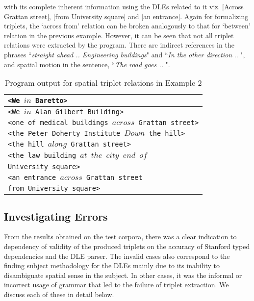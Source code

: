 \documentclass{acm_proc_article-sp}
\begin{document}
with its complete inherent information using the DLEs related to it viz. $[$Across Grattan street$]$, $[$from University square$]$ and $[$an entrance$]$. Again for formalizing triplets, the `across from' relation can be broken analogously to that for `between' relation in the previous example. However, it can be seen that not all triplet relations were extracted by the program. There are indirect references in the phrases ``\textit{straight ahead .. Engineering buildings}" and ``\textit{In the other direction} .. ", and spatial motion in the sentence, ``\textit{The road goes .. }".
\begin{table}
\begin{tabular}{|l|}
\hline
\texttt{<We $in$ Baretto>}\\ \hline
\texttt{<We $in$  Alan Gilbert Building>}\\ \hline
\texttt{<one of medical buildings $across$ Grattan street>}\\ \hline
\texttt{<the Peter Doherty Institute $Down$ the hill>}\\ \hline
\texttt{<the hill $along$ Grattan street>}\\ \hline
\texttt{<the law building $at$  $the$ $city$ $end$ $of$ }\\
\texttt{University square>}\\ \hline
\texttt{<an entrance $across$  Grattan street} \\
\texttt{from University square>}\\ \hline
\end{tabular}
\caption{Program output for spatial triplet relations in Example 2}
\label{table:ex2}
\end{table}
\subsection{Investigating Errors}
From the results obtained on the test corpora, there was a clear indication to dependency of validity of the produced triplets on the accuracy of Stanford typed dependencies and the DLE parser. The invalid cases also correspond to the finding subject methodology for the DLEs mainly due to its inability to disambiguate spatial sense in the subject. In other cases, it was the informal or incorrect usage of grammar that led to the failure of triplet extraction. We discuss each of these in detail below. 
\end{document}
